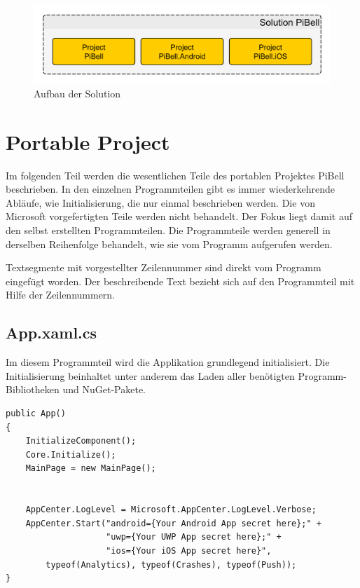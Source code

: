 \begin{figure}
\centering\includegraphics[width=0.9\linewidth]{images/xamarin/struktur.png}
\caption{Aufbau der Solution}
\label{fig:solution}
\end{figure}

%
\section{Portable Project}
Im folgenden Teil werden die wesentlichen Teile des portablen Projektes PiBell beschrieben.
In den einzelnen Programmteilen gibt es immer wiederkehrende Abläufe, wie Initialisierung, die nur einmal beschrieben werden.
Die von Microsoft vorgefertigten Teile werden nicht behandelt.
Der Fokus liegt damit auf den selbst erstellten Programmteilen.
Die Programmteile werden generell in derselben Reihenfolge behandelt, wie sie vom Programm aufgerufen werden.\par

Textsegmente mit vorgestellter Zeilennummer sind direkt vom Programm eingefügt worden.
Der beschreibende Text bezieht sich auf den Programmteil mit Hilfe der Zeilennummern.

\subsection{App.xaml.cs}
\label{ssec:app-xaml-cs}
Im diesem Programmteil wird die Applikation grundlegend initialisiert.
Die Initialisierung beinhaltet unter anderem das Laden aller benötigten Programm-Bibliotheken und NuGet-Pakete.
\begin{verbatim}
public App()
{
    InitializeComponent();
    Core.Initialize();
    MainPage = new MainPage();


    AppCenter.LogLevel = Microsoft.AppCenter.LogLevel.Verbose;
    AppCenter.Start("android={Your Android App secret here};" +
                    "uwp={Your UWP App secret here};" +
                    "ios={Your iOS App secret here}",
        typeof(Analytics), typeof(Crashes), typeof(Push));
}
\end{verbatim}
